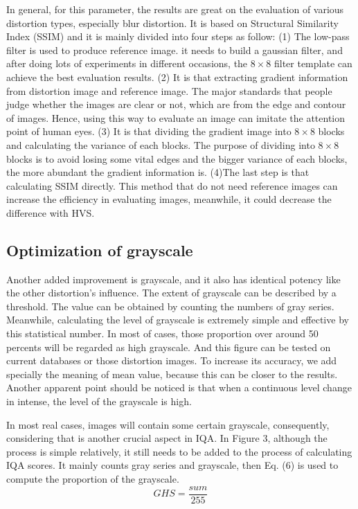 In general, for this parameter, the results are great on the evaluation of various distortion types, especially blur distortion. It is based on Structural Similarity Index (SSIM) and it is mainly divided into four steps as follow:
(1) The low-pass filter is used to produce reference image. it needs to build a gaussian filter, and after doing lots of experiments in different occasions, the $8\times8$ filter template can achieve the best evaluation results.
(2) It is that extracting gradient information from distortion image and reference image. The major standards that people judge whether the images are clear or not, which are from the edge and contour of images. Hence, using this way to evaluate an image can imitate the attention point of human eyes. 
(3) It is that dividing the gradient image into $8\times8$ blocks and calculating the variance of each blocks. The purpose of dividing into $8\times8$ blocks is to avoid losing some vital edges and the bigger variance of each blocks, the more abundant the gradient information is.
(4)The last step is that calculating SSIM directly. This method that do not need reference images can increase the efficiency in evaluating images, meanwhile, it could decrease the difference with HVS. 



\subsection{Optimization of grayscale}
\par Another added improvement is grayscale, and it also has identical potency like the other distortion’s influence. The extent of grayscale can be described by a threshold. The value can be obtained by counting the numbers of gray series. Meanwhile, calculating the level of grayscale is extremely simple and effective by this statistical number. In most of cases, those proportion over around 50 percents will be regarded as high grayscale. And this figure can be tested on current databases or those distortion images. To increase its accuracy, we add specially the meaning of mean value, because this can be closer to the results. Another apparent point should be noticed is that when a continuous level change in intense, the level of the grayscale is high. 
\par In most real cases, images will contain some certain grayscale, consequently, considering that is another crucial aspect in IQA. In Figure 3, although the process is simple relatively, it still needs to be added to the process of calculating IQA scores. It mainly counts gray series and grayscale, then Eq. (6) is used to compute the proportion of the grayscale.
\begin{equation}
GHS = \frac{sum}{255} 
\end{equation}

